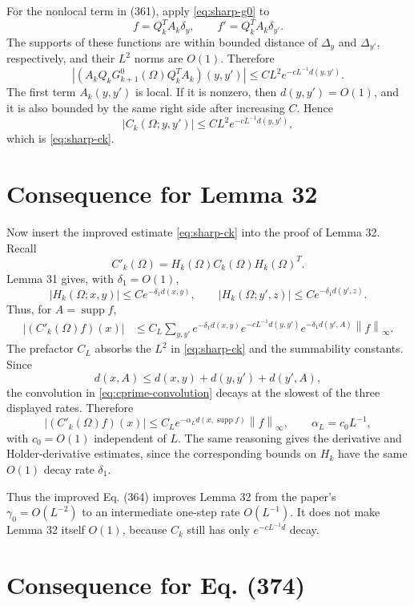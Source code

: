 \documentclass[11pt]{article}
\newcommand{\supp}{\operatorname{supp}}
\newcommand{\norm}[1]{\left\|#1\right\|}
\begin{document}
For the nonlocal term in (361), apply \eqref{eq:sharp-g0} to
\[
  f=Q_k^TA_k\delta_y,\qquad f'=Q_k^TA_k\delta_{y'}.
\]
The supports of these functions are within bounded distance of \(\Delta_y\) and
\(\Delta_{y'}\), respectively, and their \(L^2\) norms are \(O(1)\).  Therefore
\[
  |(A_kQ_kG^0_{k+1}(\Omega)Q_k^TA_k)(y,y')|
  \le
  C L^2 e^{-cL^{-1}d(y,y')}.
\]
The first term \(A_k(y,y')\) is local.  If it is nonzero, then \(d(y,y')=O(1)\),
and it is also bounded by the same right side after increasing \(C\).  Hence
\[
  |C_k(\Omega;y,y')|
  \le
  C L^2 e^{-cL^{-1}d(y,y')},
\]
which is \eqref{eq:sharp-ck}.

\section*{Consequence for Lemma 32}

Now insert the improved estimate \eqref{eq:sharp-ck} into the proof of Lemma 32.
Recall
\[
  C'_k(\Omega)=H_k(\Omega)C_k(\Omega)H_k(\Omega)^T.
\]
Lemma 31 gives, with \(\delta_1=O(1)\),
\[
  |H_k(\Omega;x,y)|\le C e^{-\delta_1d(x,y)},
  \qquad
  |H_k(\Omega;y',z)|\le C e^{-\delta_1d(y',z)}.
\]
Thus, for \(A=\supp f\),
\begin{align}
  |(C'_k(\Omega)f)(x)|
  &\le
  C_L
  \sum_{y,y'}
  e^{-\delta_1d(x,y)}
  e^{-cL^{-1}d(y,y')}
  e^{-\delta_1d(y',A)}
  \norm{f}_{\infty}.
  \label{eq:cprime-convolution}
\end{align}
The prefactor \(C_L\) absorbs the \(L^2\) in \eqref{eq:sharp-ck} and the
summability constants.  Since
\[
  d(x,A)\le d(x,y)+d(y,y')+d(y',A),
\]
the convolution in \eqref{eq:cprime-convolution} decays at the slowest of the
three displayed rates.  Therefore
\begin{equation}
  |(C'_k(\Omega)f)(x)|
  \le C_L e^{-\alpha_Ld(x,\supp f)}\norm{f}_{\infty},
  \qquad
  \alpha_L=c_0L^{-1},
  \label{eq:cprime-improved}
\end{equation}
with \(c_0=O(1)\) independent of \(L\).  The same reasoning gives the derivative
and Holder-derivative estimates, since the corresponding bounds on \(H_k\) have
the same \(O(1)\) decay rate \(\delta_1\).

Thus the improved Eq. (364) improves Lemma 32 from the paper's
\(\gamma_0=O(L^{-2})\) to an intermediate one-step rate \(O(L^{-1})\).  It does
not make Lemma 32 itself \(O(1)\), because \(C_k\) still has only
\(e^{-cL^{-1}d}\) decay.

\section*{Consequence for Eq. (374)}
\end{document}
